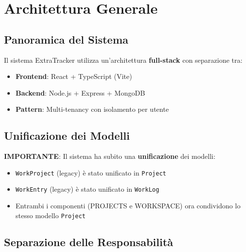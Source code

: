 \documentclass[11pt,a4paper]{article}
\begin{document}
\newpage

\section{Architettura Generale}

\subsection{Panoramica del Sistema}

Il sistema ExtraTracker utilizza un'architettura \textbf{full-stack} con separazione tra:
\begin{itemize}
    \item \textbf{Frontend}: React + TypeScript (Vite)
    \item \textbf{Backend}: Node.js + Express + MongoDB
    \item \textbf{Pattern}: Multi-tenancy con isolamento per utente
\end{itemize}

\subsection{Unificazione dei Modelli}

\textbf{IMPORTANTE}: Il sistema ha subito una \textbf{unificazione} dei modelli:
\begin{itemize}
    \item \texttt{WorkProject} (legacy) è stato unificato in \texttt{Project}
    \item \texttt{WorkEntry} (legacy) è stato unificato in \texttt{WorkLog}
    \item Entrambi i componenti (PROJECTS e WORKSPACE) ora condividono lo stesso modello \texttt{Project}
\end{itemize}

\subsection{Separazione delle Responsabilità}
\end{document}
